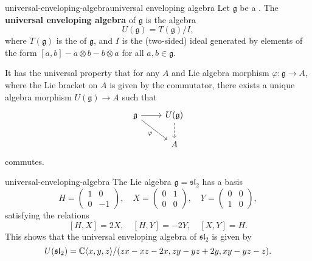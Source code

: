 \begin{topic}{universal-enveloping-algebra}{universal enveloping algebra}
    Let $\mathfrak{g}$ be a . The \textbf{universal enveloping algebra} of $\mathfrak{g}$ is the algebra
    \[ U(\mathfrak{g}) = T(\mathfrak{g}) / I , \]
    where $T(\mathfrak{g})$ is the  of $\mathfrak{g}$, and $I$ is the (two-sided) ideal generated by elements of the form $[a, b] - a \otimes b - b \otimes a$ for all $a, b \in \mathfrak{g}$.
    
    It has the universal property that for any  $A$ and Lie algebra morphism $\varphi : \mathfrak{g} \to A$, where the Lie bracket on $A$ is given by the commutator, there exists a unique algebra morphism $U(\mathfrak{g}) \to A$ such that
    \[ \begin{tikzcd} \mathfrak{g} \arrow{r} \arrow[swap]{dr}{\varphi} & U(\mathfrak{g}) \arrow[dashed]{d} \\ & A \end{tikzcd} \]
    commutes.
\end{topic}

\begin{example}{universal-enveloping-algebra}
    The Lie algebra $\mathfrak{g} = \mathfrak{sl}_2$ has a basis
    \[ H = \begin{pmatrix} 1 & 0 \\ 0 & -1 \end{pmatrix}, \quad X = \begin{pmatrix} 0 & 1 \\ 0 & 0 \end{pmatrix}, \quad Y = \begin{pmatrix} 0 & 0 \\ 1 & 0 \end{pmatrix} , \]
    satisfying the relations
    \[ [H, X] = 2X, \quad [H, Y] = -2Y, \quad [X, Y] = H . \]
    This shows that the universal enveloping algebra of $\mathfrak{sl}_2$ is given by
    \[ U(\mathfrak{sl}_2) = \mathbb{C} \langle x, y, z \rangle / (zx - xz - 2x, zy - yz + 2y, xy - yz - z) . \]
\end{example}

